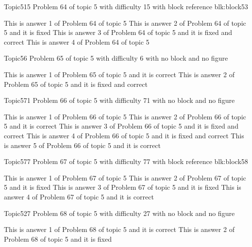 \documentclass[master]{exam}
\begin{document}
\begin{problem}[requires=blk:block53]{Topic5}{15}
	Problem 64 of topic 5 with difficulty 15 with block reference blk:block53
	\begin{answers}
		\answer This is answer 1 of Problem 64 of topic 5 
		\answer[fixed] This is answer 2 of Problem 64 of topic 5 and it is fixed
		 This is answer 3 of Problem 64 of topic 5 and it is fixed and correct
		\answer This is answer 4 of Problem 64 of topic 5 
	\end{answers}
\end{problem}

\begin{problem}{Topic5}{6}
	Problem 65 of topic 5 with difficulty 6 with no block and no figure
	\begin{answers}
		\answer[correct] This is answer 1 of Problem 65 of topic 5 and it is correct
		 This is answer 2 of Problem 65 of topic 5 and it is fixed and correct
	\end{answers}
\end{problem}

\begin{problem}{Topic5}{71}
	Problem 66 of topic 5 with difficulty 71 with no block and no figure
	\begin{answers}
		\answer This is answer 1 of Problem 66 of topic 5 
		\answer[correct] This is answer 2 of Problem 66 of topic 5 and it is correct
		 This is answer 3 of Problem 66 of topic 5 and it is fixed and correct
		 This is answer 4 of Problem 66 of topic 5 and it is fixed and correct
		\answer[correct] This is answer 5 of Problem 66 of topic 5 and it is correct
	\end{answers}
\end{problem}

\begin{problem}[requires=blk:block58]{Topic5}{77}
	Problem 67 of topic 5 with difficulty 77 with block reference blk:block58
	\begin{answers}
		\answer This is answer 1 of Problem 67 of topic 5 
		\answer[fixed] This is answer 2 of Problem 67 of topic 5 and it is fixed
		\answer[fixed] This is answer 3 of Problem 67 of topic 5 and it is fixed
		\answer[correct] This is answer 4 of Problem 67 of topic 5 and it is correct
	\end{answers}
\end{problem}

\begin{problem}{Topic5}{27}
	Problem 68 of topic 5 with difficulty 27 with no block and no figure
	\begin{answers}
		\answer[correct] This is answer 1 of Problem 68 of topic 5 and it is correct
		\answer[fixed] This is answer 2 of Problem 68 of topic 5 and it is fixed
	\end{answers}
\end{problem}
\end{document}
